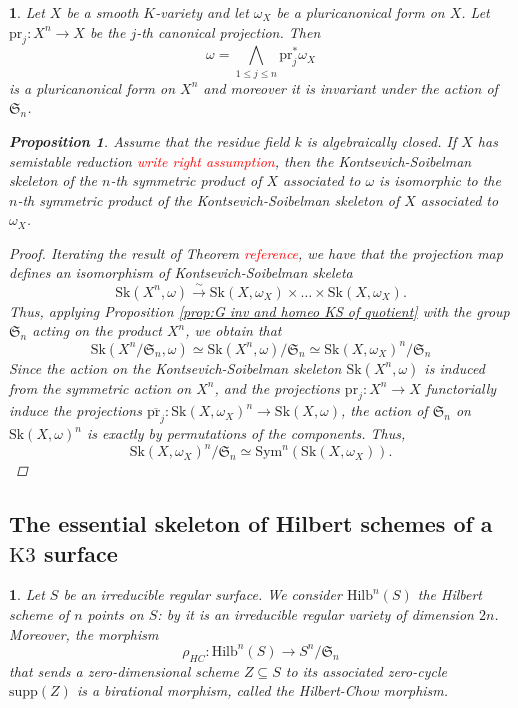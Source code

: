 \documentclass{amsart}%
\numberwithin{equation}{subsection}
\theoremstyle{plain2}
\newtheorem{prop}[equation]{Proposition}
\theoremstyle{definition2}
\theoremstyle{stepstyle}
\theoremstyle{point}
\theoremstyle{subpoint}
\newtheorem{subpoint}[equation]{}%
\newcommand{\spa}[1]{\begin{subpoint}#1\end{subpoint}}           %
\newcommand{\Hilb}{\ensuremath{\mathrm{Hilb}}}
\newcommand{\pr}{\mathrm{pr}}
\newcommand{\Sk}{\mathrm{Sk}}
\begin{document}
\spa{Let $X$ be a smooth $K$-variety and let $\omega_X$ be a pluricanonical form on $X$. Let $\pr_j:X^n \rightarrow X$ be the $j$-th canonical projection. Then $$\omega= \bigwedge_{1\leqslant j \leqslant n} \pr_j^*\omega_X$$ is a pluricanonical form on $X^n$ and moreover it is invariant under the action of $\mathfrak{S}_n$.
\begin{prop}  \label{prop semistability and KS symm quotient}
Assume that the residue field $k$ is algebraically closed.  If $X$ has semistable reduction \textcolor{red}{write right assumption}, then the Kontsevich-Soibelman skeleton of the $n$-th symmetric product of $X$ associated to $\omega$ is isomorphic to the $n$-th symmetric product of the Kontsevich-Soibelman skeleton of $X$ associated to $\omega_X$.
\end{prop}
\begin{proof}
Iterating the result of Theorem \textcolor{red}{reference}, we have that the projection map defines an isomorphism of Kontsevich-Soibelman skeleta $$\Sk(X^n, \omega) \xrightarrow{\sim} \Sk(X,\omega_X) \times  \ldots \times \Sk(X,\omega_X).$$ Thus, applying Proposition \ref{prop:G inv and homeo KS of quotient} with the group $\mathfrak{S}_n$ acting on the product $X^n$, we obtain that $$\Sk(X^n/\mathfrak{S}_n, \omega) \simeq \Sk(X^n,\omega)/\mathfrak{S}_n \simeq  \Sk(X,\omega_X)^n/ \mathfrak{S}_n$$
Since the action on the Kontsevich-Soibelman skeleton $\Sk(X^n,\omega)$ is induced from the symmetric action on $X^n$, and the projections $\pr_j:X^n \rightarrow X$ functorially induce the projections $\overline{\pr_j}: \Sk(X,\omega_X)^n \rightarrow \Sk(X,\omega)$, the action of $\mathfrak{S}_n$ on $\Sk(X,\omega)^n$ is exactly by permutations of the components. Thus, $$ \Sk(X,\omega_X)^n/ \mathfrak{S}_n \simeq \text{Sym}^n(\Sk(X,\omega_X)).$$
\end{proof}
}

\subsection{The essential skeleton of Hilbert schemes of a $\text{K3}$ surface} \label{sect essential sk Hilb}

\spa{Let $S$ be an irreducible regular surface. We consider $\Hilb^n(S)$ the Hilbert scheme of $n$ points on $S$: by \cite{Fogarty} it is an irreducible regular variety of dimension $2n$. Moreover, the morphism $$\rho_{HC}: \Hilb^n(S) \rightarrow S^n/\mathfrak{S}_n$$ that sends a zero-dimensional scheme $Z \subseteq S$ to its associated zero-cycle $\text{supp}(Z)$ is a birational morphism, called the Hilbert-Chow morphism.}
\end{document}
